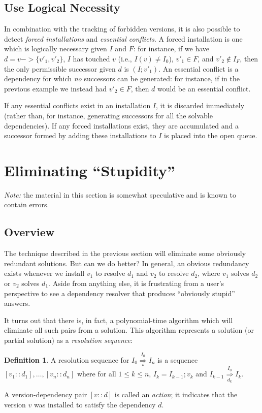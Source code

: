 \documentclass[letterpaper]{article}
\theoremstyle{definition}
\newtheorem{definition}[theorem]{Definition}
\theoremstyle{remark}
\newcommand{\nsol}[2]{\overset{#1}{\underset{#2}{\Rightarrow}}}
\newcommand{\nsolmany}[1]{\overset{#1}{\underset{*}{\Rightarrow}}}
\newcommand{\act}[2]{[#1 :: #2]}
\begin{document}
\subsection{Use Logical Necessity}

In combination with the tracking of forbidden versions, it is also
possible to detect \emph{forced installations} and \emph{essential
  conflicts}.  A forced installation is one which is logically
necessary given $I$ and $F$: for instance, if we have $d=v -> \{v'_1,
v'_2\}$, $I$ has touched $v$ (i.e., $I(v) \neq I_0$), $v'_1 \in F$,
and $v'_2 \notin I_F$, then the only permissible successor given $d$
is $(I;v'_1)$.  An essential conflict is a dependency for which
\emph{no} successors can be generated: for instance, if in the
previous example we instead had $v'_2 \in F$, then $d$ would be an
essential conflict.

If any essential conflicts exist in an installation $I$, it is
discarded immediately (rather than, for instance, generating
successors for all the solvable dependencies).  If any forced
installations exist, they are accumulated and a successor formed by
adding these installations to $I$ is placed into the open queue.

\section{Eliminating ``Stupidity''}

\emph{Note: } the material in this section is somewhat speculative and
is known to contain errors.

\subsection{Overview}

The technique described in the previous section will eliminate some
obviously redundant solutions.  But can we do better?  In general, an
obvious redundancy exists whenever we install $v_1$ to resolve $d_1$
and $v_2$ to resolve $d_2$, where $v_1$ solves $d_2$ or $v_2$ solves
$d_1$.  Aside from anything else, it is frustrating from a user's
perspective to see a dependency resolver that produces ``obviously
stupid'' answers.

It turns out that there is, in fact, a polynomial-time algorithm which
will eliminate all such pairs from a solution.  This algorithm
represents a solution (or partial solution) as a \emph{resolution
  sequence}:

\begin{definition}
  A resolution sequence for $I_0 \nsolmany{I_0} I_n$ is a sequence
  $\act{v_1}{d_1},\dots,\act{v_n}{d_n}$ where for all $1 \leq k \leq
  n$, $I_k=I_{k-1};v_k$ and $I_{k-1} \nsol{I_0}{d_k} I_k$.

  A version-dependency pair $\act{v}{d}$ is called an \emph{action};
  it indicates that the version $v$ was installed to satisfy the
  dependency $d$.
\end{definition}
\end{document}

